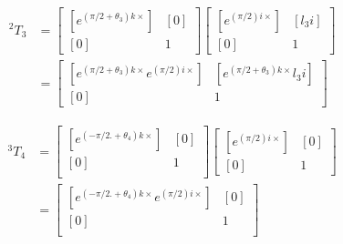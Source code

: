 \begin{solutionbox}[Q2-1]
    \begin{align*}
        {\,^2T_3} & =
        \begin{bmatrix}
            [e^{(\pi/2+\theta_3) k \times}] & [0] \\
            [0]                             & 1
        \end{bmatrix}
        \begin{bmatrix}
            [e^{(\pi/2) i \times}] & [l_3 i] \\
            [0]                    & 1
        \end{bmatrix} \\
                  & =
        \begin{bmatrix}
            [e^{(\pi/2+\theta_3) k \times}e^{(\pi/2) i \times}] & [e^{(\pi/2+\theta_3) k \times} l_3 i] \\
            [0]                                                 & 1
        \end{bmatrix}
    \end{align*}

    \begin{align*}
        {\,^3T_4} & =
        \begin{bmatrix}
            [e^{(-\pi/2. +\theta_4) k \times}] & [0] \\
            [0]                                & 1   \\
        \end{bmatrix}
        \begin{bmatrix}
            [e^{(\pi/2) i \times}] & [0] \\
            [0]                    & 1
        \end{bmatrix} \\
                  & =
        \begin{bmatrix}
            [e^{(-\pi/2. +\theta_4) k \times}e^{(\pi/2) i \times}] & [0] \\
            [0]                                                    & 1   \\
        \end{bmatrix}
    \end{align*}


\end{solutionbox}

